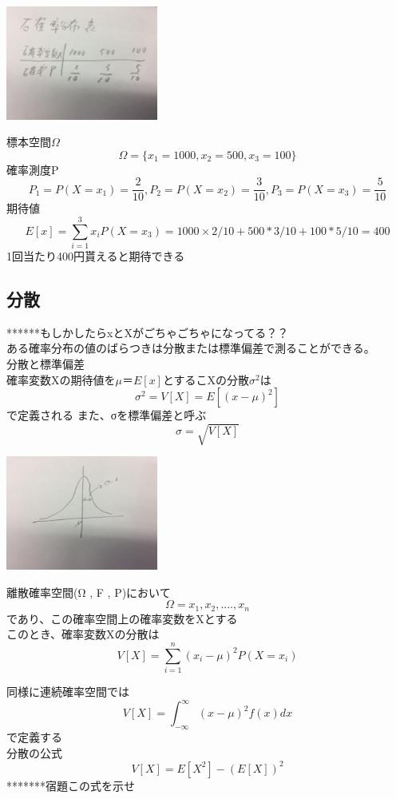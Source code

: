 \documentclass{jsarticle}
\begin{document}
			\begin{center}
				\includegraphics[width=5cm]{10_26_2.JPG}
			\end{center}
			
			標本空間$\Omega$
			\[
				\Omega=\{x_1=1000 , x_2 = 500 , x_3=100\}
			\]
			確率測度P
			\[
				P_1=P(X=x_1)=\frac{2}{10}, P_2=P(X=x_2)=\frac{3}{10} , P_3=P(X=x_3)=\frac{5}{10}
			\]
			期待値
			\[
				E[x]=\sum^3_{i=1}x_iP(X=x_3)
					=1000×2/10+500*3/10+100*5/10
					=400
			\]
			1回当たり400円貰えると期待できる
	\subsection{分散}
		
		******もしかしたらxとXがごちゃごちゃになってる？？\\
		ある確率分布の値のばらつきは分散または標準偏差で測ることができる。\\
		分散と標準偏差\\
		確率変数Xの期待値を$μ＝E[x]$とするこXの分散$σ^2$は
		\[
			σ^2=V[X]=E[(x-μ)^2]
		\]
		で定義される
		また、σを標準偏差と呼ぶ
		\[
			σ=\sqrt{V[X]}
		\]
		\begin{center}
			\includegraphics[width=5cm]{10_26_3.JPG}
		\end{center}
		
		離散確率空間(Ω , F , P)において
		\[
			\Omega={x_1,x_2,....,x_n}
		\]
		であり、この確率空間上の確率変数をXとする\\
		このとき、確率変数Xの分散は
		\[
			V[X]=\sum^n_{i=1}(x_i-μ)^2P(X=x_i)
		\]
		
		同様に連続確率空間では
		\[
			V[X]=\int^∞_{-∞} (x-μ)^2f(x)dx
		\]
		で定義する\\
		{\Large{分散の公式}}
		\[
			V[X]=E[X^2]-(E[X])^2
		\]
		*******宿題この式を示せ
\end{document}
